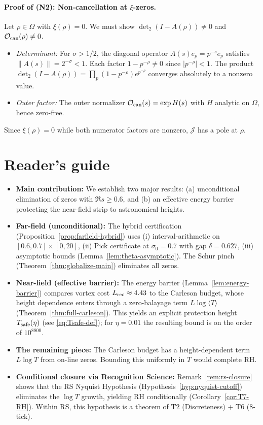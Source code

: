 \documentclass[11pt]{article}
\theoremstyle{definition}
\theoremstyle{remark}
\theoremstyle{definition}
\begin{document}
\paragraph{Proof of (N2): Non-cancellation at $\xi$-zeros.}
Let $\rho \in \Omega$ with $\xi(\rho) = 0$. We must show $\det_2(I-A(\rho)) \neq 0$ and $\mathcal{O}_{\rm can}(\rho) \neq 0$.
\begin{itemize}
\item \emph{Determinant:} For $\sigma > 1/2$, the diagonal operator $A(s)e_p = p^{-s}e_p$ satisfies $\|A(s)\| = 2^{-\sigma} < 1$. Each factor $1-p^{-\rho} \neq 0$ since $|p^{-\rho}| < 1$. The product $\det_2(I-A(\rho)) = \prod_p (1-p^{-\rho})e^{p^{-\rho}}$ converges absolutely to a nonzero value.
\item \emph{Outer factor:} The outer normalizer $\mathcal{O}_{\rm can}(s) = \exp H(s)$ with $H$ analytic on $\Omega$, hence zero-free.
\end{itemize}
Since $\xi(\rho) = 0$ while both numerator factors are nonzero, $\mathcal{J}$ has a pole at $\rho$.

\section*{Reader's guide}
\begin{itemize}
\item \textbf{Main contribution:} We establish two major results: (a) unconditional elimination of zeros with $\Re s \ge 0.6$, and (b) an effective energy barrier protecting the near-field strip to astronomical heights.
\item \textbf{Far-field (unconditional):} The hybrid certification (Proposition~\ref{prop:farfield-hybrid}) uses (i) interval-arithmetic on $[0.6, 0.7] \times [0, 20]$, (ii) Pick certificate at $\sigma_0 = 0.7$ with gap $\delta = 0.627$, (iii) asymptotic bounds (Lemma~\ref{lem:theta-asymptotic}). The Schur pinch (Theorem~\ref{thm:globalize-main}) eliminates all zeros.
\item \textbf{Near-field (effective barrier):} The energy barrier (Lemma~\ref{lem:energy-barrier}) compares vortex cost $L_{\rm rec} \approx 4.43$ to the Carleson budget, whose height dependence enters through a zero-balayage term $L\log\langle T\rangle$ (Theorem~\ref{thm:full-carleson}). This yields an explicit protection height $T_{\rm safe}(\eta)$ (see \eqref{eq:Tsafe-def}); for $\eta=0.01$ the resulting bound is on the order of $10^{8800}$.
\item \textbf{The remaining piece:} The Carleson budget has a height-dependent term $L\log T$ from on-line zeros. Bounding this uniformly in $T$ would complete RH.
\item \textbf{Conditional closure via Recognition Science:} Remark~\ref{rem:rs-closure} shows that the RS Nyquist Hypothesis (Hypothesis~\ref{hyp:nyquist-cutoff}) eliminates the $\log T$ growth, yielding RH conditionally (Corollary~\ref{cor:T7-RH}). Within RS, this hypothesis is a theorem of T2 (Discreteness) + T6 (8-tick).
\end{itemize}
\end{document}

